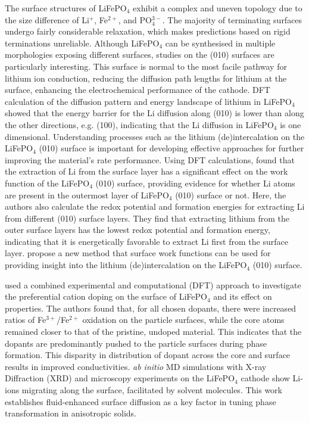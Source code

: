 \documentclass[../main.tex]{subfiles}
\begin{document}
The surface structures of LiFePO$_4$ exhibit a complex and uneven topology due to the size difference of Li$^+$, Fe$^{2+}$, and PO$_{4}^{3-}$. The majority of terminating surfaces undergo fairly considerable relaxation, which makes predictions based on rigid terminations unreliable. Although LiFePO$_4$ can be synthesised in multiple morphologies exposing different surfaces,\cite{chen2006electron,ellis2007synthesis} studies on the (010) surfaces are particularly interesting. This surface is normal to the most facile pathway for lithium ion conduction, \cite{islam2010recent} reducing the diffusion path lengths for lithium at the surface, enhancing the electrochemical performance of the cathode. DFT calculation of the diffusion pattern and energy landscape of lithium in LiFePO$_4$ showed that the energy barrier for the Li diffusion along (010) is lower than along the other directions, e.g. (100), indicating that the Li diffusion in LiFePO$_4$ is one dimensional.\cite{tankhilsaikhan2019density} Understanding processes such as the lithium (de)intercalation on the LiFePO$_4$ (010) surface is important for developing effective approaches for further improving the material's rate performance. Using DFT calculations, \citeauthor{xu2019insight} found that the extraction of Li from the surface layer has a significant effect on the work function of the LiFePO$_4$ (010) surface, providing evidence for whether Li atoms are present in the outermost layer of LiFePO$_4$ (010) surface or not.\cite{xu2019insight} Here, the authors also calculate the redox potential and formation energies for extracting Li from different (010) surface layers. They find that extracting lithium from the outer surface layers has the lowest redox potential and formation energy, indicating that it is energetically favorable to extract Li first from the surface layer. \citeauthor{xu2019insight} propose a new method that surface work functions can be used for providing insight into the lithium (de)intercalation on the LiFePO$_4$ (010) surface.\cite{xu2019insight}

\citeauthor{zhang2020observation} used a combined experimental and computational (DFT) approach to investigate the preferential cation doping on the surface of LiFePO$_4$ and its effect on properties.\cite{zhang2020observation} The authors found that, for all chosen dopants, there were increased ratios of Fe$^{3+}$/Fe$^{2+}$ oxidation on the particle surfaces, while the core atoms remained closer to that of the pristine, undoped material. This indicates that the dopants are predominantly pushed to the particle surfaces during phase formation. This disparity in distribution of dopant across the core and surface results in improved conductivities.\cite{zhang2020observation} \textit{ab initio} MD simulations with X-ray Diffraction (XRD) and microscopy experiments on the LiFePO$_4$ cathode show Li-ions migrating along the surface, facilitated by solvent molecules.\cite{li2018fluid} This work establishes fluid-enhanced surface diffusion as a key factor in tuning phase transformation in anisotropic solids.
\end{document}
